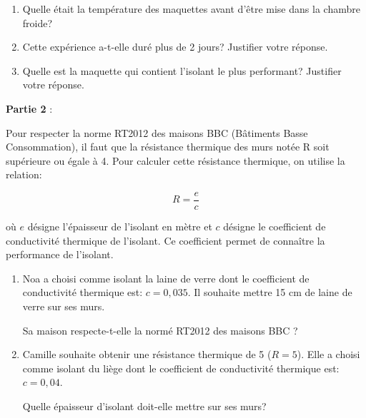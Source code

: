 \medskip

\begin{enumerate}
\item  Quelle était la température des maquettes avant d'être mise dans la chambre froide? 

\item Cette expérience a-t-elle duré plus de 2 jours? Justifier votre réponse. 


\item Quelle est la maquette qui contient l'isolant le plus performant? Justifier votre réponse. 
\end{enumerate}
\medskip


\noindent \textbf{Partie 2 }: 

\noindent Pour respecter la norme RT2012 des maisons BBC (Bâtiments Basse Consommation), il faut que la résistance thermique des murs notée R soit supérieure ou égale à 4. Pour calculer cette résistance thermique, on utilise la relation: 

$$R=\dfrac{e}{c}$$ 

\noindent où $e$ désigne l'épaisseur de l'isolant en mètre et $c$ désigne le coefficient de conductivité thermique de l'isolant. Ce coefficient permet de connaître la performance de l'isolant. 

\begin{enumerate}
\item  Noa a choisi comme isolant la laine de verre dont le coefficient de conductivité thermique est: $c = 0,035$. Il souhaite mettre 15 cm de laine de verre sur ses murs. 

Sa maison respecte-t-elle la normé RT2012 des maisons BBC ? 

\item  Camille souhaite obtenir une résistance thermique de 5 ($R = 5$). Elle a choisi comme isolant du liège dont le coefficient de conductivité thermique est: $c = 0,04$. 

Quelle épaisseur d'isolant doit-elle mettre sur ses murs? 

\end{enumerate}